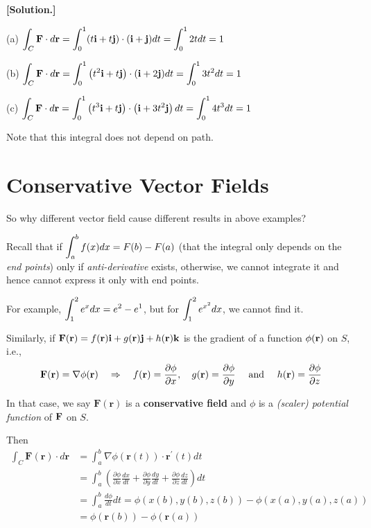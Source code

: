 \documentclass[11pt, a4paper]{MATH2023}
\newcommand{\sol}{\textbf{[Solution.] }}
\newcommand{\ii}{{\bf i}}
\newcommand{\jj}{{\bf j}}
\newcommand{\kk}{{\bf k}}
\newcommand{\rr}{{\bf r}}
\newcommand{\FF}{{\bf F}}
\begin{document}
\begin{spacing}{1.3}
    \sol

    (a) $\displaystyle \int_{C} \mathbf{F} \cdot d \mathbf{r}=\int_{0}^{1}(t \mathbf{i}+t \mathbf{j}) \cdot(\mathbf{i}+\mathbf{j}) d t=\int_{0}^{1} 2 t d t=1$
    
    (b) $\displaystyle \int_{C} \mathbf{F} \cdot d \mathbf{r}=\int_{0}^{1}\left(t^{2} \mathbf{i}+t \mathbf{j}\right) \cdot(\mathbf{i}+2 \mathbf{j}) d t=\int_{0}^{1} 3 t^{2} d t=1$
    
    (c) $\displaystyle \int_{C} \mathbf{F} \cdot d \mathbf{r}=\int_{0}^{1}\left(t^{3} \mathbf{i}+t \mathbf{j}\right) \cdot\left(\mathbf{i}+3 t^{2} \mathbf{j}\right) d t=\int_{0}^{1} 4 t^{3} d t=1$

    {\blue Note that this integral does not depend on path.}

    \newpage
    \section{Conservative Vector Fields}

    {\blue So why different vector field cause different results in above examples?}
    
    Recall that if $\displaystyle \int_a^b f(x) dx=F(b)-F(a)$ (that the integral only depends on the 
    {\it end points}) only if {\it anti-derivative } exists, otherwise, we cannot integrate it
    and hence cannot express it only with end points.

    For example, $\displaystyle \int_1^2 e^x dx = e^2-e^1$, but for $\displaystyle \int_1^2 e^{x^2} dx$,
    we cannot find it.

    \vspace{0.3in}
    Similarly, if $\FF(\rr)=f(\rr)\ii +g(\rr)\jj +h(\rr)\kk$ is the gradient of a function 
    $\phi(\rr)$ on $S$, i.e.,
    $$\FF(\rr)=\nabla \phi(\mathbf{r}) \quad \Rightarrow \quad 
    f(\mathbf{r})=\frac{\partial \phi}{\partial x}, \quad g(\mathbf{r})=\frac{\partial \phi}{\partial y} \quad 
    \text { and } \quad h(\mathbf{r})=\frac{\partial \phi}{\partial z}$$

    In that case, we say $\mathbf{F}(\mathbf{r})$ is a {\bf conservative field} and $\phi$ is a 
    {\it (scaler) potential function} of $\FF$ on $S$.
    
    Then
    $$\begin{aligned}
    \int_{C} \mathbf{F}(\mathbf{r}) \cdot d \mathbf{r} &=\int_{a}^{b} \nabla \phi(\mathbf{r}(t)) \cdot \mathbf{r}^{\prime}(t) d t \\
    &=\int_{a}^{b}\left(\frac{\partial \phi}{\partial x} \frac{d x}{d t}+\frac{\partial \phi}{\partial y} \frac{d y}{d t}+\frac{\partial \phi}{\partial z} \frac{d z}{d t}\right) d t \\
    &=\int_{a}^{b} \frac{d \phi}{d t} d t=\phi(x(b), y(b), z(b))-\phi(x(a), y(a), z(a)) \\
    &=\phi(\mathbf{r}(b))-\phi(\mathbf{r}(a))
    \end{aligned}$$


\end{spacing}
\end{document}
